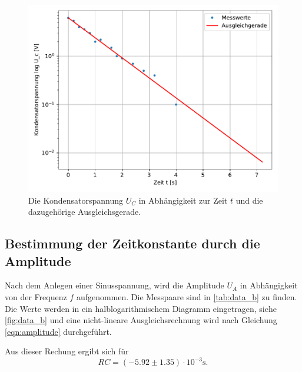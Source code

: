 \begin{figure}
  \centering
  \includegraphics{content/data_a_ausgleich.pdf}
  \caption{Die Kondensatorspannung $U_C$ in Abhängigkeit zur Zeit $t$ und die dazugehörige Ausgleichsgerade.}
  \label{fig:data_a}
\end{figure}

\subsection{Bestimmung der Zeitkonstante durch die Amplitude}
\label{subsec:Aufgabe_B}
Nach dem Anlegen einer Sinusspannung, wird die Amplitude $U_A$ in Abhängigkeit von der Frequenz $f$ aufgenommen.
Die Messpaare sind in \autoref{tab:data_b} zu finden.
Die Werte werden in ein halblogarithmischem Diagramm eingetragen, siehe \autoref{fig:data_b} und eine nicht-lineare Ausgleichsrechnung wird nach Gleichung \eqref{eqn:amplitude} durchgeführt.

\noindent
Aus dieser Rechung ergibt sich für 
\begin{equation*}
  RC = (-5.92 \pm 1.35) \cdot 10^{-3} \si{\second}.
\end{equation*}

